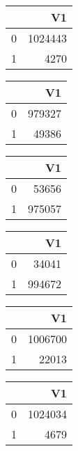 \bigskip\bigskip
\centering
\begin{tabular}{rr}
  \hline
 & V1 \\ 
  \hline
0 & 1024443 \\ 
  1 & 4270 \\ 
   \hline
\end{tabular}

\bigskip\bigskip
\centering
\begin{tabular}{rr}
  \hline
 & V1 \\ 
  \hline
0 & 979327 \\ 
  1 & 49386 \\ 
   \hline
\end{tabular}

\bigskip\bigskip
\centering
\begin{tabular}{rr}
  \hline
 & V1 \\ 
  \hline
0 & 53656 \\ 
  1 & 975057 \\ 
   \hline
\end{tabular}

\bigskip\bigskip
\centering
\begin{tabular}{rr}
  \hline
 & V1 \\ 
  \hline
0 & 34041 \\ 
  1 & 994672 \\ 
   \hline
\end{tabular}

\bigskip\bigskip
\centering
\begin{tabular}{rr}
  \hline
 & V1 \\ 
  \hline
0 & 1006700 \\ 
  1 & 22013 \\ 
   \hline
\end{tabular}

\bigskip\bigskip
\centering
\begin{tabular}{rr}
  \hline
 & V1 \\ 
  \hline
0 & 1024034 \\ 
  1 & 4679 \\ 
   \hline
\end{tabular}

